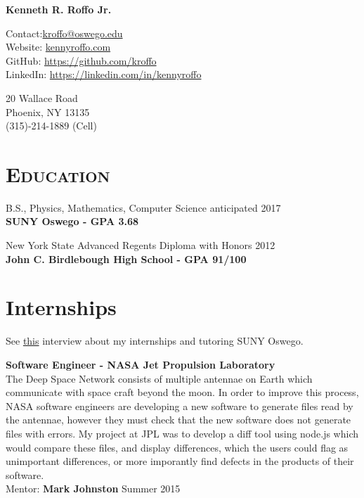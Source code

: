 \documentclass[8pt]{article}
\def\name{Kenneth R. Roffo Jr.}
\renewenvironment{itemize}{
  \begin{list}{}{
    \setlength{\leftmargin}{1.5em}
  }
}{
  \end{list}
}
\begin{document}
{\huge \bf \name}


Contact:\large \href{mailto:kroffo@oswego.edu}{kroffo@oswego.edu}\\
Website: \href{http://kennyroffo.com}{kennyroffo.com}\\
GitHub: \href{https://github.com/kroffo}{https://github.com/kroffo}\\
LinkedIn: \href{https://www.linkedin.com/in/kennyroffo}{https://linkedin.com/in/kennyroffo}\\

\vspace{0.15in}

20 Wallace Road \\
Phoenix, NY 13135 \\
(315)-214-1889 (Cell)


\section*{\textsc{Education}}

\begin{itemize}
  \item B.S., Physics, Mathematics, Computer Science \hfill anticipated 2017\\
  \textbf{SUNY Oswego - GPA 3.68}
  \item New York State Advanced Regents Diploma with Honors \hfill 2012\\
  \textbf{John C. Birdlebough High School - GPA 91/100}
  \end{itemize}	

\section*{Internships} See \href{https://www.youtube.com/watch?v=BiJOjhm_ov4}{this} interview about my internships and tutoring SUNY Oswego.
\begin{itemize}
\item \textbf{Software Engineer - NASA Jet Propulsion Laboratory}\\
  The Deep Space Network consists of multiple antennae on Earth which communicate with space craft beyond the moon. In order to improve this process, NASA software engineers are developing a new software to generate files read by the antennae, however they must check that the new software does not generate files with errors. My project at JPL was to develop a diff tool using node.js which would compare these files, and display differences, which the users could flag as unimportant differences, or more imporantly find defects in the products of their software.\\
  Mentor: \textbf{Mark Johnston} \hfill Summer 2015


\end{itemize}
\end{document}
